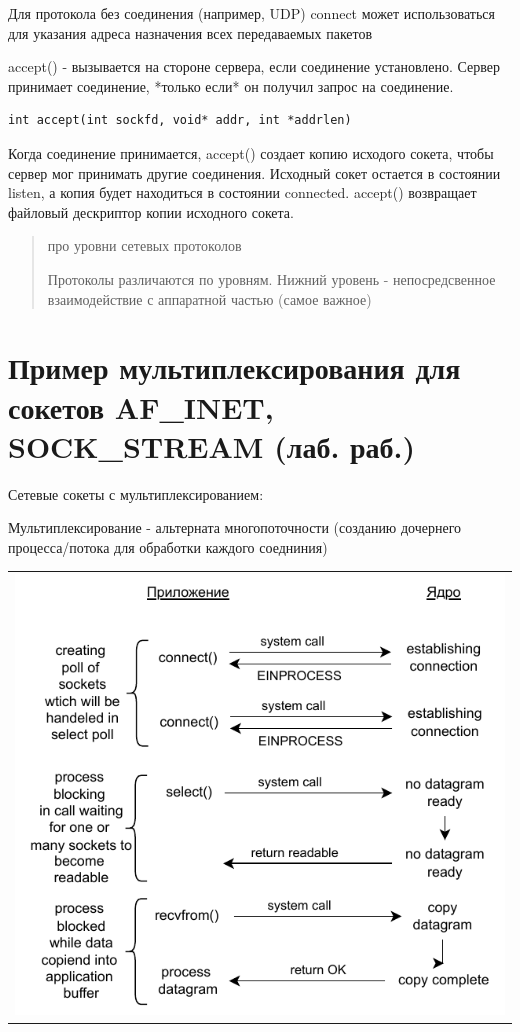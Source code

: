Для протокола без соединения (например, UDP) connect может использоваться для указания адреса назначения всех передаваемых пакетов

accept() - вызывается на стороне сервера, если соединение установлено. Сервер принимает соединение, *только если* он получил запрос на соединение.

\begin{lstlisting}
int accept(int sockfd, void* addr, int *addrlen)
\end{lstlisting}

Когда соединение принимается, accept()  создает копию исходого сокета, чтобы сервер мог принимать другие соединения. Исходный сокет остается в состоянии listen, а копия будет находиться в состоянии connected. accept() возвращает файловый дескриптор копии исходного сокета.

\begin{quote}
про уровни сетевых протоколов

Протоколы различаются по уровням. Нижний уровень - непосредсвенное взаимодействие с аппаратной частью (самое важное)
\end{quote}

\section{Пример мультиплексирования для сокетов  AF\_INET, SOCK\_STREAM (лаб. раб.)}

Сетевые сокеты с мультиплексированием:

Мультиплексирование - альтерната многопоточности (созданию дочернего процесса/потока для обработки каждого соедниния)

\begin{table}[H]
  \centering
  \begin{tabular}{p{1\linewidth}}
    \centering
    \includegraphics[width=0.8\linewidth]{./images/7-2.pdf}
  \end{tabular}
\end{table}

